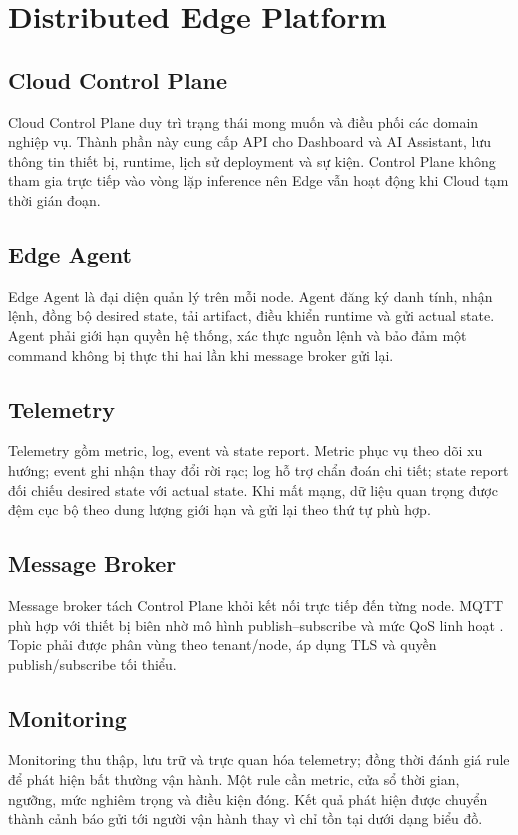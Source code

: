 \section{Distributed Edge Platform}

\subsection{Cloud Control Plane}

Cloud Control Plane duy trì trạng thái mong muốn và điều phối các domain nghiệp
vụ. Thành phần này cung cấp API cho Dashboard và AI Assistant, lưu thông tin
thiết bị, runtime, lịch sử deployment và sự kiện. Control Plane không tham gia trực tiếp
vào vòng lặp inference nên Edge vẫn hoạt động khi Cloud tạm thời gián đoạn.

\subsection{Edge Agent}

Edge Agent là đại diện quản lý trên mỗi node. Agent đăng ký danh tính, nhận lệnh,
đồng bộ desired state, tải artifact, điều khiển runtime và gửi actual state. Agent
phải giới hạn quyền hệ thống, xác thực nguồn lệnh và bảo đảm một command không
bị thực thi hai lần khi message broker gửi lại.

\subsection{Telemetry}

Telemetry gồm metric, log, event và state report. Metric phục vụ theo dõi xu
hướng; event ghi nhận thay đổi rời rạc; log hỗ trợ chẩn đoán chi tiết; state report
đối chiếu desired state với actual state. Khi mất mạng, dữ liệu quan trọng được
đệm cục bộ theo dung lượng giới hạn và gửi lại theo thứ tự phù hợp.

\subsection{Message Broker}

Message broker tách Control Plane khỏi kết nối trực tiếp đến từng node. MQTT phù
hợp với thiết bị biên nhờ mô hình publish--subscribe và mức QoS linh hoạt
\cite{mqtt5}. Topic phải được phân vùng theo tenant/node, áp dụng TLS và quyền
publish/subscribe tối thiểu.

\subsection{Monitoring}

Monitoring thu thập, lưu trữ và trực quan hóa telemetry; đồng thời đánh giá rule
để phát hiện bất thường vận hành. Một rule cần metric, cửa sổ thời gian, ngưỡng,
mức nghiêm trọng và điều kiện đóng. Kết quả phát hiện được chuyển thành cảnh báo
gửi tới người vận hành thay vì chỉ tồn tại dưới dạng biểu đồ.